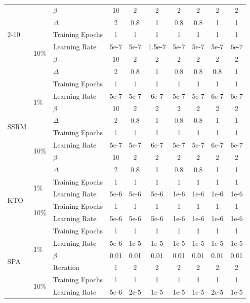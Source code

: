 \documentclass{article} %
\newcommand\rebuttal[1]{\textcolor{black}{#1}}
\begin{document}
\begin{table}[hp]
\begin{tabular}{lll ccc cc cc}
& & $\beta$ & 10 & 2 & 2 & 2 & 2 & 2 & 2 \\
& & $\Delta$ & 2 & 0.8 & 1 & 0.8 & 0.8 & 1 & 1 \\
\cmidrule{2-10}
& \multirow{4}{*}{10\%}
& Training Epochs & 1 & 1 & 1 & 1 & 1 & 1 & 1 \\
& & Learning Rate & 5e-7 & 5e-7 & \rebuttal{1.5e-7} & 5e-7 & 5e-7 & \rebuttal{5e-7} & 6e-7 \\
& & $\beta$ & 10 & 2 & 2 & 2 & 2 & 2 & 2 \\
& & $\Delta$ & 2 & 0.8 & 1 & 0.8 & 0.8 & \rebuttal{0.8} & 1 \\
\midrule
\multirow{8}{*}{SSRM} 
& \multirow{4}{*}{1\%}
& Training Epochs & 1 & 1 & 1 & 1 & 1 & 1 & 1 \\
& & Learning Rate & 5e-7 & 5e-7 & 6e-7 & 5e-7 & 5e-7 & 6e-7 & 6e-7 \\
& & $\beta$ & 10 & 2 & 2 & 2 & 2 & 2 & 2 \\
& & $\Delta$ & 2 & 0.8 & 1 & 0.8 & 0.8 & 1 & 1 \\
\cmidrule{2-10}
& \multirow{4}{*}{10\%}
& Training Epochs & 1 & 1 & 1 & 1 & 1 & 1 & 1 \\
& & Learning Rate & 5e-7 & 5e-7 & 6e-7 & 5e-7 & 5e-7 & 6e-7 & 6e-7 \\
& & $\beta$ & 10 & 2 & 2 & 2 & 2 & 2 & 2 \\
& & $\Delta$ & 2 & 0.8 & 1 & 0.8 & 0.8 & 1 & 1 \\
\midrule
\multirow{4}{*}{KTO} 
& \multirow{2}{*}{1\%}
& Training Epochs & 1 & 1 & 1 & 1 & 1 & 1 & 1 \\
& & Learning Rate & 5e-6 & 5e-6 & 5e-6 & 1e-6 & 1e-6 & 1e-6 & 1e-6 \\
\cmidrule{2-10}
& \multirow{2}{*}{10\%}
& Training Epochs & 1 & 1 & 1 & 1 & 1 & 1 & 1 \\
& & Learning Rate & 5e-6 & 5e-6 & 5e-6 & 1e-6 & 1e-6 & 1e-6 & 1e-6 \\
\midrule
\multirow{8}{*}{SPA} 
& \multirow{4}{*}{1\%}
& Training Epochs & 1 & 1 & 1 & 1 & 1 & 1 & 1 \\
& & Learning Rate & 5e-6 & 1e-5 & 1e-5 & 1e-5 & 1e-5 & 1e-5 & 1e-5 \\
& & $\beta$ & 0.01 & 0.01 & 0.01 & 0.01 & 0.01 & 0.01 & 0.01 \\
& & Iteration & 1 & 2 & 2 & 2 & 2 & 2 & 2 \\
\cmidrule{2-10}
& \multirow{4}{*}{10\%}
& Training Epochs & 1 & 1 & 1 & 1 & 1 & 1 & 1 \\
& & Learning Rate & 5e-6 & \rebuttal{2e-5} & 1e-5 & 1e-5 & 1e-5 & \rebuttal{2e-5} & 1e-5 \\

\end{tabular}
\end{table}
\end{document}
